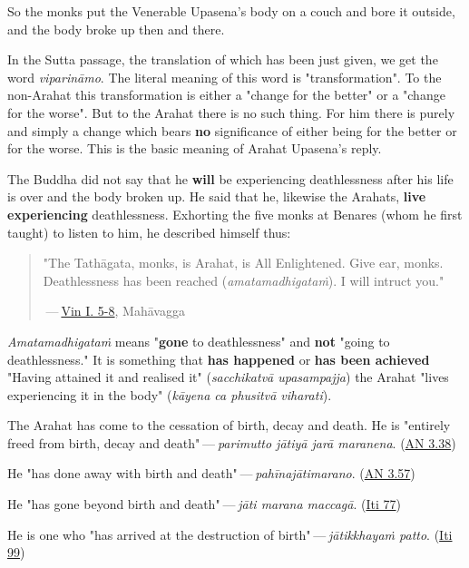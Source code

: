So the monks put the Venerable Upasena’s body on a couch and bore it
outside, and the body broke up then and there.


In the Sutta passage, the translation of which has been just given, we
get the word \emph{viparināmo}. The literal meaning of this word is
"transformation". To the non-Arahat this transformation is either a
"change for the better" or a "change for the worse". But to the Arahat
there is no such thing. For him there is purely and simply a change
which bears \textbf{no} significance of either being for the better or for the
worse. This is the basic meaning of Arahat Upasena’s reply.


The Buddha did not say that he \textbf{will} be experiencing deathlessness
after his life is over and the body broken up. He said that he, likewise
the Arahats, \textbf{live experiencing} deathlessness. Exhorting the five monks
at Benares (whom he first taught) to listen to him, he described himself
thus:


\begin{quotation}
"The Tathāgata, monks, is Arahat, is All Enlightened. Give ear,
monks. Deathlessness has been reached (\emph{amatamadhigataṁ}). I will
intruct you."


 — \href{https://suttacentral.net/pli-tv-kd1/en/brahmali}{Vin I. 5-8}, Mahāvagga


\end{quotation}

\emph{Amatamadhigataṁ} means "\textbf{gone} to deathlessness" and \textbf{not} "going to
deathlessness." It is something that \textbf{has happened} or \textbf{has been achieved}
"Having attained it and realised it" (\emph{sacchikatvā upasampajja}) the Arahat
"lives experiencing it in the body" (\emph{kāyena ca phusitvā viharati}).


The Arahat has come to the cessation of birth, decay and death. He is
"entirely freed from birth, decay and death" — \emph{parimutto jātiyā jarā
maranena}. (\href{https://suttacentral.net/an3.38/en/bodhi}{AN 3.38})


He "has done away with birth and death" — \emph{pahīnajātimarano}. (\href{https://suttacentral.net/an3.57/en/bodhi}{AN 3.57})


He "has gone beyond birth and death" — \emph{jāti marana maccagā}. (\href{https://suttacentral.net/iti77/en/sujato}{Iti 77})


He is one who "has arrived at the destruction of birth" — \emph{jātikkhayaṁ patto}. (\href{https://suttacentral.net/iti99/en/sujato}{Iti 99})


